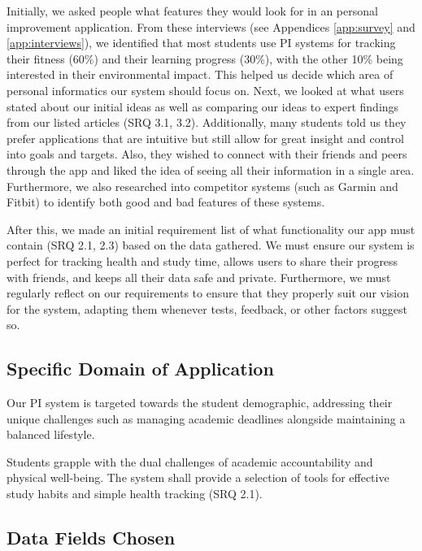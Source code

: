 \documentclass[11pt]{article}
\begin{document}
Initially, we asked people what features they would look for in an personal
improvement application. From these interviews (see Appendices \ref{app:survey}
and \ref{app:interviews}), we identified that most students use PI systems for
tracking their fitness (60\%) and their learning progress (30\%), with the
other 10\% being interested in their environmental impact. This helped us
decide which area of personal informatics our system should focus on. Next, we
looked at what users stated about our initial ideas as well as comparing our
ideas to expert findings from our listed articles (SRQ 3.1, 3.2). Additionally,
many students told us they prefer applications that are intuitive but still
allow for great insight and control into goals and targets. Also, they wished
to connect with their friends and peers through the app and liked the idea of
seeing all their information in a single area. Furthermore, we also researched
into competitor systems (such as Garmin and Fitbit) to identify both good and
bad features of these systems.\par

After this, we made an initial requirement list of what functionality our app must contain (SRQ 2.1, 2.3)
based on the data gathered. We must ensure our system is perfect for tracking
health and study time, allows users to share their progress with friends, and
keeps all their data safe and private. Furthermore, we must regularly reflect on our requirements
to ensure that they properly suit our vision for the system, adapting them whenever tests, feedback, or other factors suggest so.
 

\subsection{Specific Domain of Application}

Our PI system is targeted towards the student demographic,
addressing their unique challenges such as managing academic deadlines
alongside maintaining a balanced lifestyle.\par 

Students grapple with the dual challenges of academic accountability and
physical well-being. The system shall provide a selection of tools for effective
study habits and simple health tracking (SRQ 2.1).
 

\subsection{Data Fields Chosen}
\end{document}
